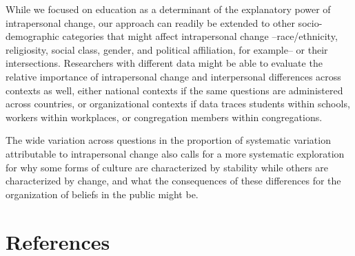 \documentclass[
  11pt,
]{article}
\begin{document}
While we focused on education as a determinant of the explanatory power
of intrapersonal change, our approach can readily be extended to other
socio-demographic categories that might affect intrapersonal change
--race/ethnicity, religiosity, social class, gender, and political
affiliation, for example-- or their intersections. Researchers with
different data might be able to evaluate the relative importance of
intrapersonal change and interpersonal differences across contexts as
well, either national contexts if the same questions are administered
across countries, or organizational contexts if data traces students
within schools, workers within workplaces, or congregation members
within congregations.

The wide variation across questions in the proportion of systematic
variation attributable to intrapersonal change also calls for a more
systematic exploration for why some forms of culture are characterized
by stability while others are characterized by change, and what the
consequences of these differences for the organization of beliefs in the
public might be.

\hypertarget{references}{%
\section{References}\label{references}}
\end{document}
